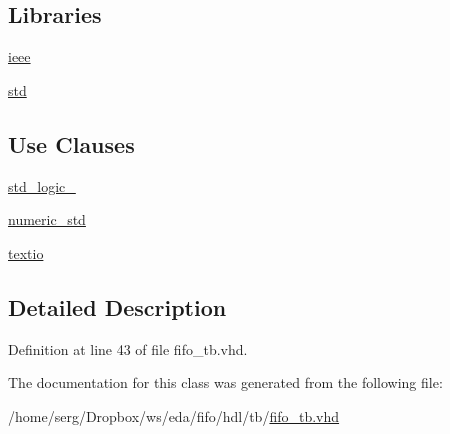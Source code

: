 \subsection*{Libraries}
 \begin{DoxyCompactItemize}
\item 
\hyperlink{classfifo__tb_a0a6af6eef40212dbaf130d57ce711256}{ieee} \hypertarget{classfifo__tb_a0a6af6eef40212dbaf130d57ce711256}{}\label{classfifo__tb_a0a6af6eef40212dbaf130d57ce711256}

\item 
\hyperlink{classfifo__tb_a17a7c5b2be3cba8592e83e385620216b}{std} \hypertarget{classfifo__tb_a17a7c5b2be3cba8592e83e385620216b}{}\label{classfifo__tb_a17a7c5b2be3cba8592e83e385620216b}

\end{DoxyCompactItemize}
\subsection*{Use Clauses}
 \begin{DoxyCompactItemize}
\item 
\hyperlink{classfifo__tb_acd03516902501cd1c7296a98e22c6fcb}{std\+\_\+logic\+\_}   \hypertarget{classfifo__tb_acd03516902501cd1c7296a98e22c6fcb}{}\label{classfifo__tb_acd03516902501cd1c7296a98e22c6fcb}

\item 
\hyperlink{classfifo__tb_a2edc34402b573437d5f25fa90ba4013e}{numeric\+\_\+std}   \hypertarget{classfifo__tb_a2edc34402b573437d5f25fa90ba4013e}{}\label{classfifo__tb_a2edc34402b573437d5f25fa90ba4013e}

\item 
\hyperlink{classfifo__tb_aa8c4e25998323a84db5b1fa701b92fcb}{textio}   \hypertarget{classfifo__tb_aa8c4e25998323a84db5b1fa701b92fcb}{}\label{classfifo__tb_aa8c4e25998323a84db5b1fa701b92fcb}

\end{DoxyCompactItemize}


\subsection{Detailed Description}


Definition at line 43 of file fifo\+\_\+tb.\+vhd.



The documentation for this class was generated from the following file\+:\begin{DoxyCompactItemize}
\item 
/home/serg/\+Dropbox/ws/eda/fifo/hdl/tb/\hyperlink{fifo__tb_8vhd}{fifo\+\_\+tb.\+vhd}\end{DoxyCompactItemize}
